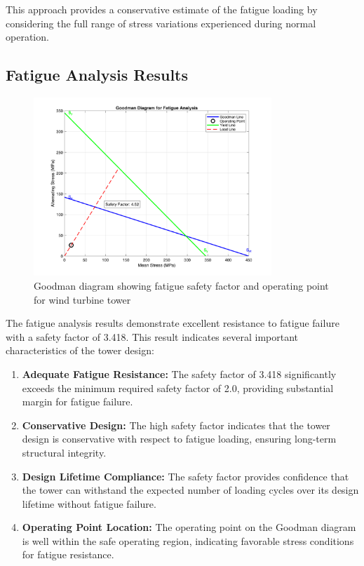 \documentclass[12pt]{article}
\begin{document}
This approach provides a conservative estimate of the fatigue loading by considering the full range of stress variations experienced during normal operation.

\subsection{Fatigue Analysis Results}

\begin{figure}[H]
    \centering
    \includegraphics[width=0.8\textwidth]{PNGS/Goodman_Diagram_Analysis.png}
    \caption{Goodman diagram showing fatigue safety factor and operating point for wind turbine tower}
    \label{fig:goodman}
\end{figure}

The fatigue analysis results demonstrate excellent resistance to fatigue failure with a safety factor of 3.418. This result indicates several important characteristics of the tower design:

\begin{enumerate}
    \item \textbf{Adequate Fatigue Resistance:} The safety factor of 3.418 significantly exceeds the minimum required safety factor of 2.0, providing substantial margin for fatigue failure.
    
    \item \textbf{Conservative Design:} The high safety factor indicates that the tower design is conservative with respect to fatigue loading, ensuring long-term structural integrity.
    
    \item \textbf{Design Lifetime Compliance:} The safety factor provides confidence that the tower can withstand the expected number of loading cycles over its design lifetime without fatigue failure.
    
    \item \textbf{Operating Point Location:} The operating point on the Goodman diagram is well within the safe operating region, indicating favorable stress conditions for fatigue resistance.
\end{enumerate}
\end{document}
